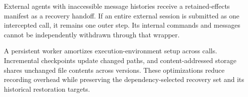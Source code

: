 External agents with inaccessible message histories receive a retained-effects
manifest as a recovery handoff.
If an entire external session is submitted as one intercepted call, it remains
one outer step.
Its internal commands and messages cannot be independently withdrawn through
that wrapper.

A persistent worker amortizes execution-environment setup across calls.
Incremental checkpoints update changed paths, and content-addressed storage
shares unchanged file contents across versions. These optimizations reduce
recording overhead while preserving the dependency-selected recovery set and
its historical restoration targets.

